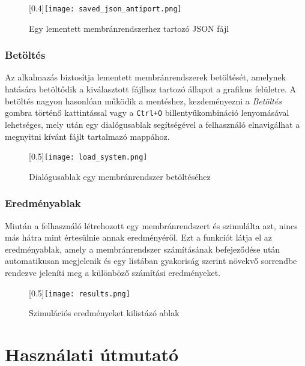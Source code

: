 \begin{figure}[H]
	\centering
	\scalebox{0.4}[0.4]{\texttt{[image: saved\_json\_antiport.png]}}
	\caption{Egy lementett membránrendszerhez tartozó JSON fájl  \protect\footnotemark}
	\label{fig:saved_json}
\end{figure}


\subsubsection{Betöltés}

Az alkalmazás biztosítja lementett membránrendszerek betöltését, amelynek hatására betöltődik a kiválasztott fájlhoz tartozó állapot a grafikus felületre.
A betöltés nagyon hasonlóan működik a mentéshez, kezdeményezni a \textit{Betöltés} gombra történő kattintással vagy a \verb|Ctrl+O| billentyűkombináció lenyomásával lehetséges, mely után egy dialógusablak segítségével a felhasználó elnavigálhat a megnyitni kívánt fájlt tartalmazó mappához.

\begin{figure}[H]
	\centering
	\scalebox{0.5}[0.5]{\texttt{[image: load\_system.png]}}
	\caption{Dialógusablak egy membránrendszer betöltéséhez}
	\label{fig:load_system}
\end{figure}

\subsubsection{Eredményablak}

Miután a felhasználó létrehozott egy membránrendszert és szimulálta azt, nincs más hátra mint értesülnie annak eredményéről.  Ezt a funkciót látja el az eredményablak, amely a membránrendszer számításának befejeződése után automatikusan megjelenik és egy listában gyakoriság szerint növekvő sorrendbe rendezve jeleníti meg a különböző számítási eredményeket.

\begin{figure}[H]
	\centering
	\scalebox{0.5}[0.5]{\texttt{[image: results.png]}}
	\caption{Szimulációs eredményeket kilistázó ablak}
	\label{fig:load_system}
\end{figure}

\section{Használati útmutató}\label{help}

